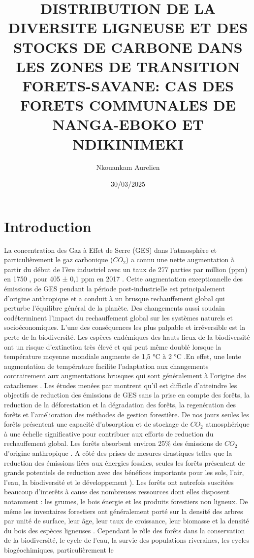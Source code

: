 \documentclass[
  12pt,
  a4paper,
  extrafontsizes,
  onecolumn,
  openright]{book}
\title{DISTRIBUTION DE LA DIVERSITE LIGNEUSE ET DES STOCKS DE CARBONE DANS LES ZONES DE TRANSITION FORETS-SAVANE: CAS DES FORETS COMMUNALES DE NANGA-EBOKO ET NDIKINIMEKI}
\author{Nkouankam Aurelien}
\date{30/03/2025}
\theoremstyle{definition}
\theoremstyle{definition}
\theoremstyle{definition}
\theoremstyle{definition}
\theoremstyle{remark}
\begin{document}
\maketitle

{
\hypersetup{linkcolor=}
\setcounter{tocdepth}{2}
\tableofcontents
}
\listoffigures
\listoftables
\hypertarget{introduction}{%
\chapter*{Introduction}\label{introduction}}

La concentration des Gaz à Effet de Serre (GES) dans l'atmosphère et particulièrement le gaz carbonique (\(CO_2\)) a connu une nette augmentation à partir du début de l'ère industriel avec un taux de 277 parties par million (ppm) en 1750 \citep{Joos_Spahni2008}, pour 405 ± 0,1 ppm en 2017 \citep{LeQuere2018}. Cette augmentation exceptionnelle des émissions de GES pendant la période post-industrielle est principalement d'origine anthropique et a conduit à un brusque rechauffement global qui perturbe l'équilibre général de la planète. Des changements aussi soudain codéterminent l'impact du rechauffement global sur les systèmes naturels et socioéconomiques. L'une des conséquences les plus palpable et irréversible est la perte de la biodiversité. Les espèces endémiques des hauts lieux de la biodiversité ont un risque d'extinction très élevé et qui peut même doublé lorsque la température moyenne mondiale augmente de 1,5 °C à 2 °C \citep{Anonyme2022a}.En effet, une lente augmentation de température facilite l'adaptation aux changements contrairement aux augmentations brusques qui sont généralement à l'origine des cataclismes \citep{Joos_Spahni2008}. Les études menées par \citep{Griscom2017, Seymour_Busch2016} montrent qu'il est difficile d'atteindre les objectifs de reduction des émissions de GES sans la prise en compte des forêts, la reduction de la déforestation et la dégradation des forêts, la regenération des forêts et l'amélioration des méthodes de gestion forestière. De nos jours seules les forêts présentent une capacité d'absorption et de stockage de \(CO_2\) atmosphérique à une échelle significative pour contribuer aux efforts de reduction du rechauffement global. Les forêts absorbent environ 25\% des émissions de \(CO_2\) d'origine anthropique \citep{LeQuere2018}. A côté des prises de mesures drastiques telles que la reduction des émissions liées aux énergies fossiles, seules les forêts présentent de grands potentiels de reduction avec des bénéfices importants pour les sols, l'air, l'eau, la biodiversité et le développement \citep{VanGoor_Martijn2019}). Les forêts ont autrefois suscitées beaucoup d'interêts à cause des nombreuses ressources dont elles disposent notamment : les grumes, le bois énergie et les produits forestiers non ligneux. De même les inventaires forestiers ont généralement porté sur la densité des arbres par unité de surface, leur âge, leur taux de croissance, leur biomasse et la densité du bois des espèces ligneuses \citep{Watson2009}. Cependant le rôle des forêts dans la conservation de la biodiversité, le cycle de l'eau, la survie des populations riveraines, les cycles biogéochimiques, particulièrement le 
\end{document}
